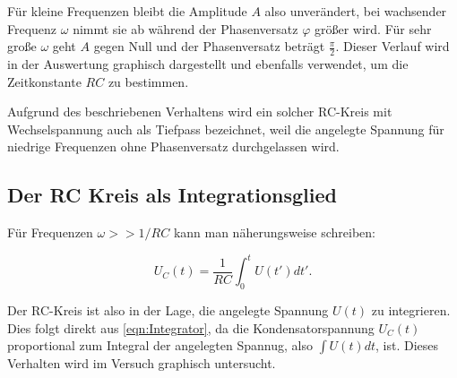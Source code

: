 Für kleine Frequenzen bleibt die Amplitude $A$ also unverändert, bei wachsender Frequenz $\omega$ nimmt sie ab während
der Phasenversatz $\varphi$ größer wird. Für sehr große $\omega$ geht $A$ gegen Null und der Phasenversatz beträgt $\frac{\pi}{2}$.
Dieser Verlauf wird in der Auswertung graphisch dargestellt und ebenfalls verwendet, um die Zeitkonstante $RC$ zu bestimmen.

Aufgrund des beschriebenen Verhaltens wird ein solcher RC-Kreis mit Wechselspannung auch als Tiefpass bezeichnet, weil die angelegte
Spannung für niedrige Frequenzen ohne Phasenversatz durchgelassen wird.

\subsection{Der RC Kreis als Integrationsglied}
\label{sec:theorie-integration}
Für Frequenzen $\omega >> 1/RC$ kann man näherungsweise schreiben:

\begin{equation}
    U_{C}(t) = \frac{1}{RC}\int_{0}^{t}U({t}')d{t}'. \label{eqn:Integrator}
\end{equation}

Der RC-Kreis ist also in der Lage, die angelegte Spannung $U(t)$ zu integrieren. Dies folgt direkt aus \ref{eqn:Integrator},
da die Kondensatorspannung $U_{C}(t)$ proportional zum Integral der angelegten Spannug, also $\int U(t)dt$, ist.
Dieses Verhalten wird im Versuch graphisch untersucht.